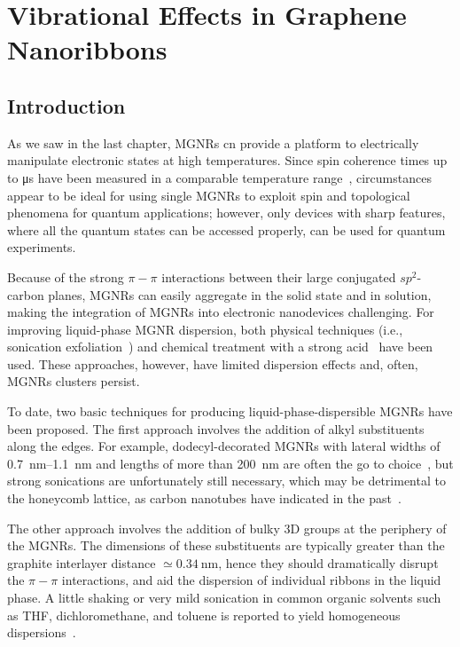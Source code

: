 \chapter{\label{ch:solubility}Vibrational Effects in Graphene Nanoribbons}

\minitoc

\section{Introduction}\label{solubility:sec:intro}

As we saw in the last chapter, \glspl{MGNR} cn provide a platform to electrically manipulate electronic states at high temperatures. Since spin coherence times up to \si{\micro\second} have been measured in a comparable temperature range~\cite{slota2018magnetic,lombardi2019quantum}, circumstances appear to be ideal for using single \glspl{MGNR} to exploit spin and topological phenomena for quantum applications; however, only devices with sharp features, where all the quantum states can be accessed properly, can be used for quantum experiments.

Because of the strong $\pi-\pi$ interactions between their large conjugated $sp^2$-carbon planes, \glspl{MGNR} can easily aggregate in the solid state and in solution, making the integration of \glspl{MGNR} into electronic nanodevices challenging. For improving liquid-phase \gls{MGNR} dispersion, both physical techniques (i.e., sonication exfoliation~\cite{wang2008room}) and chemical treatment with a strong acid~\cite{shekhirev2017interfacial} have been used. These approaches, however, have limited dispersion effects and, often, \glspl{MGNR} clusters persist.

To date, two basic techniques for producing liquid-phase-dispersible \glspl{MGNR} have been proposed. The first approach involves the addition of alkyl substituents along the edges. For example, dodecyl-decorated \glspl{MGNR} with lateral widths of \SIrange{0.7}{1.1}{\nano\metre} and lengths of more than \SI{200}{\nano\metre} are often the go to choice~\cite{narita2014synthesis}, but strong sonications are unfortunately still necessary, which may be detrimental to the honeycomb lattice, as carbon nanotubes have indicated in the past~\cite{ham2005explanation, vaisman2006role}.

The other approach involves the addition of bulky 3D groups at the periphery of the \glspl{MGNR}. The dimensions of these substituents are typically greater than the graphite interlayer distance $\simeq\SI{0.34}{\nano\metre}$, hence they should dramatically disrupt the $\pi-\pi$ interactions, and aid the dispersion of individual ribbons in the liquid phase. A little shaking or very mild sonication in common organic solvents such as THF, dichloromethane, and toluene is reported to yield homogeneous dispersions~\cite{huang2018intrinsic}.

